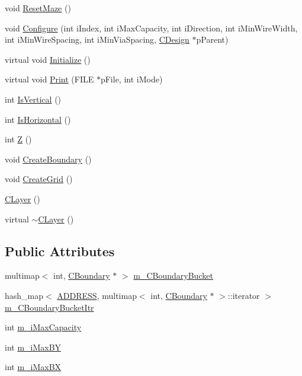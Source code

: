 \begin{DoxyCompactItemize}
\item 
void \mbox{\hyperlink{classCLayer_a7f89eaebcbf57737b1522bcec4ca8bbd}{Reset\+Maze}} ()
\item 
void \mbox{\hyperlink{classCLayer_a3d0413e4f025d57639ae6bbd6d34955f}{Configure}} (int i\+Index, int i\+Max\+Capacity, int i\+Direction, int i\+Min\+Wire\+Width, int i\+Min\+Wire\+Spacing, int i\+Min\+Via\+Spacing, \mbox{\hyperlink{classCDesign}{C\+Design}} $\ast$p\+Parent)
\item 
virtual void \mbox{\hyperlink{classCLayer_af987bec19614f92ca98bb9e492aecac0}{Initialize}} ()
\item 
virtual void \mbox{\hyperlink{classCLayer_a5bba2c50c546b8e5301370f08e963ee6}{Print}} (F\+I\+LE $\ast$p\+File, int i\+Mode)
\item 
int \mbox{\hyperlink{classCLayer_a3e1df9f2cdde24028b52418e2c3b09a3}{Is\+Vertical}} ()
\item 
int \mbox{\hyperlink{classCLayer_a0660beda10939c898dce3991dc2a1194}{Is\+Horizontal}} ()
\item 
int \mbox{\hyperlink{classCLayer_a141f6d1ca53bf7ad0d39ad5caec04afb}{Z}} ()
\item 
void \mbox{\hyperlink{classCLayer_ab33982ec157f1aa3fd4543a160574a1a}{Create\+Boundary}} ()
\item 
void \mbox{\hyperlink{classCLayer_a6d9a84c543b8c2b4f5fd555d24a567f2}{Create\+Grid}} ()
\item 
\mbox{\hyperlink{classCLayer_a6156e0a33ab7511c751d8ddc8975c9a3}{C\+Layer}} ()
\item 
virtual \mbox{\hyperlink{classCLayer_a78d56eb9fffa4188383cdc0ca91ee67c}{$\sim$\+C\+Layer}} ()
\end{DoxyCompactItemize}
\subsection*{Public Attributes}
\begin{DoxyCompactItemize}
\item 
multimap$<$ int, \mbox{\hyperlink{classCBoundary}{C\+Boundary}} $\ast$ $>$ \mbox{\hyperlink{classCLayer_a92dce7beca8ec4fa0ad07a46114c1f68}{m\+\_\+\+C\+Boundary\+Bucket}}
\item 
hash\+\_\+map$<$ \mbox{\hyperlink{BoxRouter_8h_a280feb883e9d4a7edcc69c8bcb9f38f2}{A\+D\+D\+R\+E\+SS}}, multimap$<$ int, \mbox{\hyperlink{classCBoundary}{C\+Boundary}} $\ast$ $>$\+::iterator $>$ \mbox{\hyperlink{classCLayer_afe3a156ca744d73f927f19fb320d50c3}{m\+\_\+\+C\+Boundary\+Bucket\+Itr}}
\item 
int \mbox{\hyperlink{classCLayer_a8129c42ff6ec606bf17c77c4d2b110ee}{m\+\_\+i\+Max\+Capacity}}
\item 
int \mbox{\hyperlink{classCLayer_a7455370559666eeca28d7418991cb7d9}{m\+\_\+i\+Max\+BY}}
\item 
int \mbox{\hyperlink{classCLayer_a294e5e06e21df7cd7c80aba99c22eacd}{m\+\_\+i\+Max\+BX}}
\end{DoxyCompactItemize}
